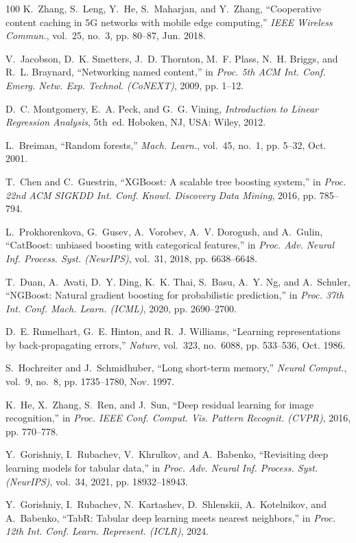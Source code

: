 \documentclass[journal]{IEEEtran}
\begin{document}
\begin{thebibliography}{100}
K.~Zhang, S.~Leng, Y.~He, S.~Maharjan, and Y.~Zhang, ``Cooperative content caching in 5G networks with mobile edge computing,'' \textit{IEEE Wireless Commun.}, vol.~25, no.~3, pp. 80--87, Jun. 2018.

V.~Jacobson, D.~K. Smetters, J.~D. Thornton, M.~F. Plass, N.~H. Briggs, and R.~L. Braynard, ``Networking named content,'' in \textit{Proc. 5th ACM Int. Conf. Emerg. Netw. Exp. Technol. (CoNEXT)}, 2009, pp. 1--12.

D.~C. Montgomery, E.~A. Peck, and G.~G. Vining, \textit{Introduction to Linear Regression Analysis}, 5th~ed. Hoboken, NJ, USA: Wiley, 2012.

L.~Breiman, ``Random forests,'' \textit{Mach. Learn.}, vol.~45, no.~1, pp. 5--32, Oct. 2001.

T.~Chen and C.~Guestrin, ``XGBoost: A scalable tree boosting system,'' in \textit{Proc. 22nd ACM SIGKDD Int. Conf. Knowl. Discovery Data Mining}, 2016, pp. 785--794.

L.~Prokhorenkova, G.~Gusev, A.~Vorobev, A.~V. Dorogush, and A.~Gulin, ``CatBoost: unbiased boosting with categorical features,'' in \textit{Proc. Adv. Neural Inf. Process. Syst. (NeurIPS)}, vol.~31, 2018, pp. 6638--6648.

T.~Duan, A.~Avati, D.~Y. Ding, K.~K. Thai, S.~Basu, A.~Y. Ng, and A.~Schuler, ``NGBoost: Natural gradient boosting for probabilistic prediction,'' in \textit{Proc. 37th Int. Conf. Mach. Learn. (ICML)}, 2020, pp. 2690--2700.

D.~E. Rumelhart, G.~E. Hinton, and R.~J. Williams, ``Learning representations by back-propagating errors,'' \textit{Nature}, vol.~323, no.~6088, pp. 533--536, Oct. 1986.

S.~Hochreiter and J.~Schmidhuber, ``Long short-term memory,'' \textit{Neural Comput.}, vol.~9, no.~8, pp. 1735--1780, Nov. 1997.

K.~He, X.~Zhang, S.~Ren, and J.~Sun, ``Deep residual learning for image recognition,'' in \textit{Proc. IEEE Conf. Comput. Vis. Pattern Recognit. (CVPR)}, 2016, pp. 770--778.

Y.~Gorishniy, I.~Rubachev, V.~Khrulkov, and A.~Babenko, ``Revisiting deep learning models for tabular data,'' in \textit{Proc. Adv. Neural Inf. Process. Syst. (NeurIPS)}, vol.~34, 2021, pp. 18932--18943.

Y.~Gorishniy, I.~Rubachev, N.~Kartashev, D.~Shlenskii, A.~Kotelnikov, and A.~Babenko, ``TabR: Tabular deep learning meets nearest neighbors,'' in \textit{Proc. 12th Int. Conf. Learn. Represent. (ICLR)}, 2024.

\end{thebibliography}
\end{document}
